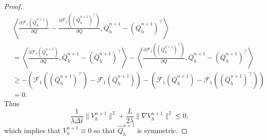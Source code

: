 \documentclass[10pt,letterpaper]{amsart}
\theoremstyle{definition}{\newtheorem{definition}[lemma]{Definition}}
\theoremstyle{note}{\newtheorem{claim}{Claim}[section]
\newtheorem*{claim*}{Claim}}
\numberwithin{equation}{section}
\begin{document}
\begin{proof}
\begin{align*}
	&\left\langle \frac{\partial \mathcal{F}_1(\overline{Q}_h^{n+1})}{\partial Q} - \frac{\partial \mathcal{F}_1((\overline{Q}_h^{n+1})^\top)}{\partial Q}, \overline{Q}_h^{n+1} - (\overline{Q}_h^{n+1})^\top\right\rangle \\
	&= \left\langle \frac{\partial \mathcal{F}_1(\overline{Q}_h^{n+1})}{\partial Q} , \overline{Q}_h^{n+1} - (\overline{Q}_h^{n+1})^\top\right\rangle - \left\langle \frac{\partial \mathcal{F}_1((\overline{Q}_h^{n+1})^\top)}{\partial Q}, \overline{Q}_h^{n+1} - (\overline{Q}_h^{n+1})^\top\right\rangle\\
	&\ge -(\mathcal{F}_1((\overline{Q}_h^{n+1})^\top) - \mathcal{F}_1(\overline{Q}_h^{n+1})) - (\mathcal{F}_1(\overline{Q}_h^{n+1}) - \mathcal{F}_1((\overline{Q}_h^{n+1})^\top))\\
	&= 0.
	\end{align*}
	Thus
	\[
	\frac{1}{\lambda\Delta t} \|V_h^{n+1}\|^2 + \frac{L}{2\lambda}\|\nabla V_h^{n+1}\|^2 \le 0,
	\]
	which implies that $V_h^{n+1} \equiv 0$ so that $\widehat{Q}_h^{n+1}$ is symmetric.
	

\end{proof}
\end{document}
